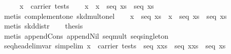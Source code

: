 \begin{isabellebody}
\ {}\isanewline
\ \ \isamarkupfalse%
\ {}x\ {}\ carrier\ tests{}\isanewline
\ \ \isamarkupfalse%
\ {}{}x\ {}\ {}x{}\ {}\ seq\ xs\ {}\ seq\ xs{}\isanewline
\ \ \ \ \isamarkupfalse%
\ {}metis\ complement{}one\ skd{}mult{}onel{}\isanewline
\ \ \isamarkupfalse%
\ {}x\ {}\ seq\ xs\ {}\ {}x\ {}\ seq\ xs\ {}\ seq\ xs{}\isanewline
\ \ \ \ \isamarkupfalse%
\ {}metis\ skd{}distr{}\isanewline
\ \ \isamarkupfalse%
\ {}thesis\isanewline
\ \ \ \ \isamarkupfalse%
\ {}metis\ append{}Cons\ append{}Nil\ seq{}mult\ seq{}singleton{}\isanewline
{}\isamarkupfalse%
%
\endisatagproof
{\isafoldproof}%
%
\isadelimproof
\isanewline
%
\endisadelimproof
\isanewline
{}\isamarkupfalse%
\ seq{}head{}elim{}var\ {}simp{}elim{}{}\ {}x\ {}\ carrier\ tests\ {}\ seq\ {}{}x{}xs{}\ {}\ seq\ {}x{}xs{}\ {}\ seq\ xs{}\isanewline

\end{isabellebody}

